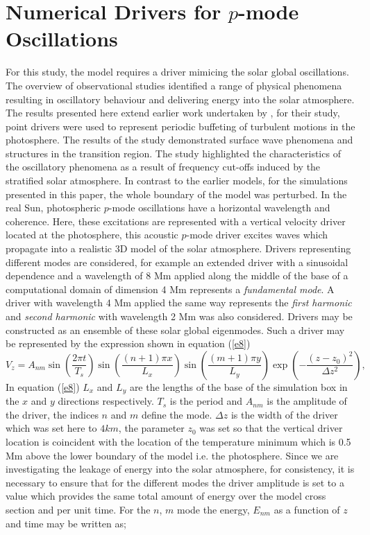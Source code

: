 \documentclass[preprint,authoryear,12pt]{elsarticle}
\begin{document}
\section{Numerical Drivers for $p$-mode Oscillations}
For this study, the model requires a driver mimicing the solar global oscillations.  The overview of observational studies identified a range of physical phenomena resulting in oscillatory behaviour and delivering energy into the solar atmosphere.  The results presented here extend earlier work undertaken by  \citet{Malins2007A}, for their study, point drivers were used to represent periodic buffeting of turbulent motions in the photosphere. The results of the study demonstrated surface wave 
phenomena and structures in the transition region. The study highlighted the characteristics of the oscillatory 
phenomena as a result of frequency cut-offs induced by the stratified solar atmosphere. In contrast to the earlier models, for the simulations presented in this paper, the whole boundary of the model was perturbed.  In the real Sun, photospheric $p$-mode 
oscillations have a horizontal wavelength and coherence. Here, these excitations are represented with a 
vertical velocity driver located at the photosphere, this acoustic $p$-mode driver excites waves which propagate 
into a realistic 3D model of the solar atmosphere. Drivers representing different modes are considered, for 
example  an extended driver with a sinusoidal dependence and a wavelength of 8 Mm applied along the 
middle of the base of a computational domain of dimension 4 Mm represents  a {\it fundamental mode}. 
A driver with wavelength 4 Mm applied the same way represents the {\it first harmonic} and {\it second harmonic} 
with wavelength 2 Mm was also considered. Drivers may be constructed as an ensemble of these solar 
global eigenmodes.  Such a driver may be represented by the expression shown in equation (\ref{e8}) 
\begin{equation}
V_{z}=A_{nm} \sin\left(\frac{2\pi t}{T_s} \right)\sin\left(  \frac{(n+1)\pi x}{L_x} \right)  \sin\left(\frac{(m+1)\pi y}{L_y} \right)
\exp\left( -\frac{(z-z_0)^2}{\Delta z^2} \right),
\label{e8}
\end{equation}
In equation (\ref{e8}) $L_{x}$ and $L_{y}$ are the lengths of the base of the simulation box in the $x$ and $y$ directions respectively. $T_{s}$ is the period and $A_{nm}$ is the amplitude of the driver, the indices $n$ and $m$ define the mode. $\Delta z$ is the width of the driver which was set here to $4km$, the parameter $z_{0}$ was set so that the vertical driver location is coincident with the location of the temperature minimum which is 0.5 Mm above the lower boundary of the model i.e. the photosphere.   Since we are investigating the leakage of energy into the solar atmosphere, for consistency, it is necessary to ensure that for the different modes the driver amplitude is set to a value which provides the same total amount of energy over the model cross section and per unit time. For the $n$, $m$ mode the energy, $E_{nm}$ as a function of $z$ and time may be written as;
\end{document}
